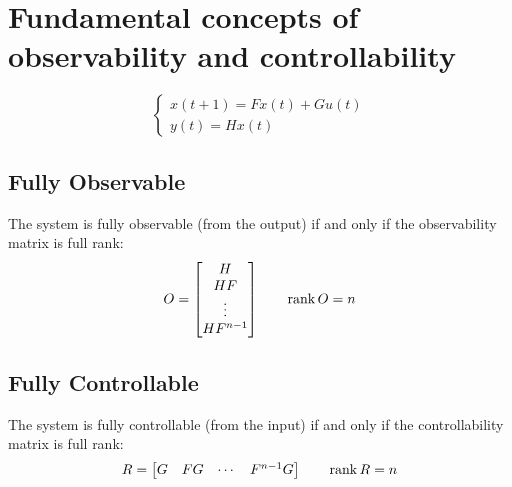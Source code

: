 
\begin{figure}[H]
    \centering
\end{figure}

\section{Fundamental concepts of observability and controllability}

\[
    \begin{cases}
        x(t+1) = Fx(t) + Gu(t) \\
        y(t) = Hx(t)
    \end{cases}
\]

\subsection{Fully Observable}
The system is fully observable (from the output) if and only if the observability matrix is full rank:
\[
    O = \begin{bmatrix}
        H \\
        HF \\
        \vdots \\
        HF^{n-1}
    \end{bmatrix}
    \qquad
    \operatorname*{rank} O = n
\]

\subsection{Fully Controllable}
The system is fully controllable (from the input) if and only if the controllability matrix is full rank:
\[
    R = \begin{bmatrix}
        G & FG & \cdots & F^{n-1}G
    \end{bmatrix}
    \qquad
    \operatorname*{rank} R = n
\]

